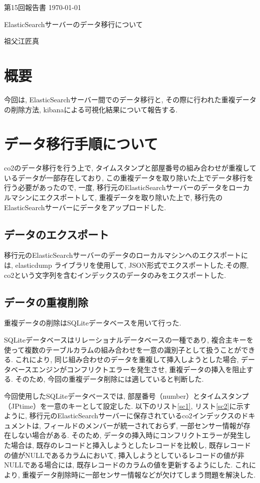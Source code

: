 \documentclass[a4j,12pt,]{jarticle}
\begin{document}
{\noindent\small 第15回報告書 \hfill\today}
\begin{center}
  {\Large ElasticSearchサーバーのデータ移行について}
\end{center}
\begin{flushright}
  祖父江匠真 \\
\end{flushright}

\section{概要}
今回は, ElasticSearchサーバー間でのデータ移行と, その際に行われた重複データの削除方法, kibanaによる可視化結果について報告する.

\section{データ移行手順について}

co2のデータ移行を行う上で, タイムスタンプと部屋番号の組み合わせが重複しているデータが一部存在しており, この重複データを取り除いた上でデータ移行を行う必要があったので, 一度, 移行元のElasticSearchサーバーのデータをローカルマシンにエクスポートして, 重複データを取り除いた上で, 移行先のElasticSearchサーバーにデータをアップロードした.

\subsection{データのエクスポート}
移行元のElasticSearchサーバーのデータのローカルマシンへのエクスポートには, elasticdump \cite{1}ライブラリを使用して, JSON形式でエクスポートした.その際, co2という文字列を含むインデックスのデータのみをエクスポートした.

\subsection{データの重複削除}
重複データの削除はSQLiteデータベースを用いて行った.

SQLiteデータベースはリレーショナルデータベースの一種であり, 複合主キーを使って複数のテーブルカラムの組み合わせを一意の識別子として扱うことができる. これにより, 同じ組み合わせのデータを重複して挿入しようとした場合, データベースエンジンがコンフリクトエラーを発生させ, 重複データの挿入を阻止する. そのため, 今回の重複データ削除には適していると判断した.

今回使用したSQLiteデータベースでは, 部屋番号（number）とタイムスタンプ（JPtime）を一意のキーとして設定した. 以下のリスト\ref{sc1}, リスト\ref{sc2}に示すように, 移行元のElasticSearchサーバーに保存されているco2インデックスのドキュメントは, フィールドのメンバーが統一されておらず, 一部センサー情報が存在しない場合がある. そのため, データの挿入時にコンフリクトエラーが発生した場合は, 既存のレコードと挿入しようとしたレコードを比較し, 既存レコードの値がNULLであるカラムにおいて, 挿入しようとしているレコードの値が非NULLである場合には, 既存レコードのカラムの値を更新するようにした. これにより, 重複データ削除時に一部センサー情報などが欠けてしまう問題を解決した.
\end{document}
